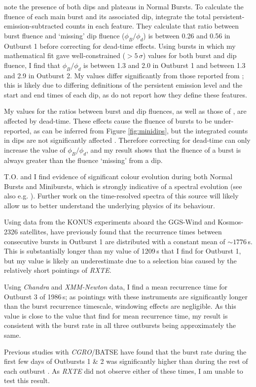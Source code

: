 \par \citet{Giles_BP} note the presence of both dips and plateaus in Normal Bursts.  To calculate the fluence of each main burst and its associated dip, \citeauthor{Giles_BP} integrate the total persistent-emission-subtracted counts in each feature.  They calculate that ratio between burst fluence and `missing' dip fluence ($\phi_{B}/\phi_{d}$) is between 0.26 and 0.56 in Outburst 1 before correcting for dead-time effects.  Using bursts in which my mathematical fit gave well-constrained ($>5\,\sigma$) values for both burst and dip fluence, I find that $\phi_{B}/\phi_{d}$ is between 1.3 and 2.0 in Outburst 1 and between 1.3 and 2.9 in Outburst 2.  My values differ significantly from those reported from \citeauthor{Giles_BP}; this is likely due to differing definitions of the persistent emission level and the start and end times of each dip, as \citeauthor{Giles_BP} do not report how they define these features.
\par My values for the ratios between burst and dip fluences, as well as those of \citeauthor{Giles_BP}, are affected by dead-time.  These effects cause the fluence of bursts to be under-reported, as can be inferred from Figure \ref{fig:minidips}, but the integrated counts in dips are not significantly affected \citep{Giles_BP}.  Therefore correcting for dead-time can only increase the value of $\phi_{B}/\phi_{d}$, and my result shows that the fluence of a burst is always greater than the fluence `missing' from a dip.
\par \textsf{T.O.} and I find evidence of significant colour evolution during both Normal Bursts and Minibursts, which is strongly indicative of a spectral evolution (see also e.g. \citealp{Woods_OB2}).  Further work on the time-resolved spectra of this source will likely allow us to better understand the underlying physics of its behaviour.
\par Using data from the KONUS experiments aboard the GGS-Wind and Kosmos-2326 satellites, \citet{Aptekar_Recur} have previously found that the recurrence times between consecutive bursts in Outburst 1 are distributed with a constant mean of $\sim1776$\,s.  This is substantially longer than my value of 1209\,s that I find for Outburst 1, but my value is likely an underestimate due to a selection bias caused by the relatively short pointings of \textit{RXTE}.
\par Using \textit{Chandra} and \textit{XMM-Newton} data, I find a mean recurrence time for Outburst 3 of 1986\,s; as pointings with these instruments are significantly longer than the burst recurrence timescale, windowing effects are negligible.  As this value is close to the value that \citet{Aptekar_Recur} find for mean recurrence time, my result is consistent with the burst rate in all three outbursts being approximately the same.
\par Previous studies with \textit{CGRO}/BATSE have found that the burst rate during the first few days of Outbursts 1 \& 2 was significantly higher than during the rest of each outburst \citep{Kouveliotou_BP,Woods_OB2}.  As \textit{RXTE} did not observe either of these times, I am unable to test this result.

